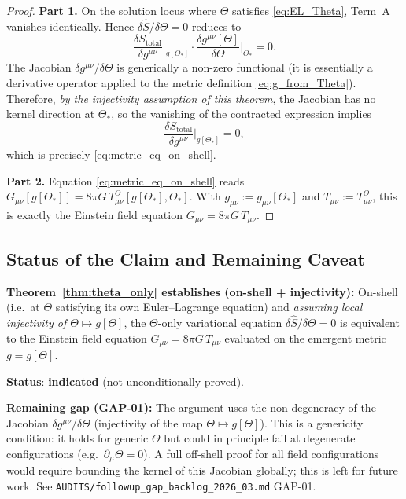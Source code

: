 \documentclass[12pt]{article}
\theoremstyle{definition}
\theoremstyle{remark}
\begin{document}
\begin{proof}
\textbf{Part 1.}
On the solution locus where $\Theta$ satisfies \eqref{eq:EL_Theta}, Term~A vanishes
identically.  Hence $\delta\hat{S}/\delta\Theta = 0$ reduces to
\[
  \frac{\delta S_{\text{total}}}{\delta g^{\mu\nu}}\bigg|_{g[\Theta_*]}
  \cdot\frac{\delta g^{\mu\nu}[\Theta]}{\delta\Theta}\bigg|_{\Theta_*} = 0.
\]
The Jacobian $\delta g^{\mu\nu}/\delta\Theta$ is generically a non-zero functional
(it is essentially a derivative operator applied to the metric definition
\eqref{eq:g_from_Theta}).  Therefore, \emph{by the injectivity assumption of this
theorem}, the Jacobian has no kernel direction at $\Theta_*$, so the
vanishing of the contracted expression implies
\[
  \frac{\delta S_{\text{total}}}{\delta g^{\mu\nu}}\bigg|_{g[\Theta_*]} = 0,
\]
which is precisely \eqref{eq:metric_eq_on_shell}.

\textbf{Part 2.}
Equation \eqref{eq:metric_eq_on_shell} reads
$G_{\mu\nu}[g[\Theta_*]] = 8\pi G\,T^\Theta_{\mu\nu}[g[\Theta_*],\Theta_*]$.
With $g_{\mu\nu} := g_{\mu\nu}[\Theta_*]$ and $T_{\mu\nu} := T^\Theta_{\mu\nu}$,
this is exactly the Einstein field equation $G_{\mu\nu}=8\pi G\,T_{\mu\nu}$.
\end{proof}

\subsection{Status of the Claim and Remaining Caveat}

\begin{tcolorbox}[colback=yellow!10!white,colframe=orange!75!black,title=Precise Statement]
\textbf{Theorem~\ref{thm:theta_only} establishes (on-shell + injectivity):}
On-shell (i.e.\ at $\Theta$ satisfying its own Euler--Lagrange equation) and
\emph{assuming local injectivity of $\Theta\mapsto g[\Theta]$}, the
$\Theta$-only variational equation $\delta\hat{S}/\delta\Theta=0$ is equivalent to
the Einstein field equation $G_{\mu\nu}=8\pi G\,T_{\mu\nu}$ evaluated on the
emergent metric $g=g[\Theta]$.

\medskip
\noindent\textbf{Status}: \textbf{indicated} (not unconditionally proved).

\medskip
\noindent\textbf{Remaining gap (GAP-01):}
The argument uses the non-degeneracy of the Jacobian $\delta g^{\mu\nu}/\delta\Theta$
(injectivity of the map $\Theta\mapsto g[\Theta]$).  This is a genericity condition:
it holds for generic $\Theta$ but could in principle fail at degenerate configurations
(e.g.\ $\partial_\mu\Theta=0$).  A full off-shell proof for all field configurations
would require bounding the kernel of this Jacobian globally; this is left for future work.
See \texttt{AUDITS/followup\_gap\_backlog\_2026\_03.md} GAP-01.
\end{tcolorbox}
\end{document}
